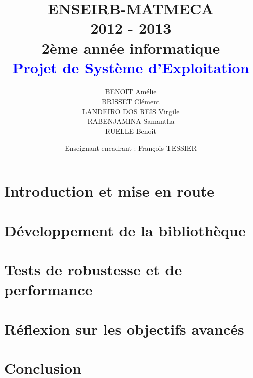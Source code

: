 \documentclass[a4paper,12pt]{article}
\title{
	\normalsize{ENSEIRB-MATMECA \\ 
	2012 - 2013 \\
	2ème année informatique} \\
	\vspace{15mm}
	\Huge{\textcolor{blue}{Projet de Système d'Exploitation }}
}
\author{ BENOIT Amélie \\ BRISSET Clément \\ LANDEIRO DOS REIS Virgile \\ RABENJAMINA Samantha \\ RUELLE Benoit}
\date{
	\normalsize{Enseignant encadrant : François TESSIER}
}
\begin{document}
\maketitle

\clearpage

\section{Introduction et mise en route}


\section{Développement de la bibliothèque}


\section{Tests de robustesse et de performance}


\section{Réflexion sur les objectifs avancés}


\section{Conclusion}

\end{document}
